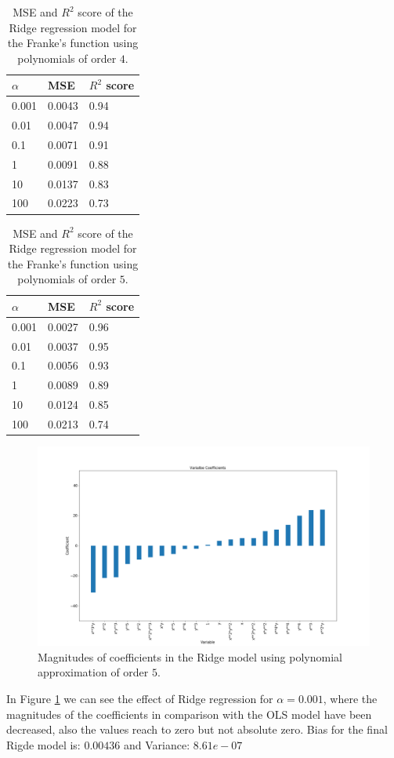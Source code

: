 \documentclass [11pt]{article}
\begin{document}
\begin{table}[H]
\centering
\begin{tabular}{lll}
\hline
$\alpha$ & MSE    & $R^{2}$ score \\ \hline
0.001     & 0.0043 & 0.94          \\
0.01      & 0.0047 & 0.94          \\
0.1       & 0.0071 & 0.91          \\
1         & 0.0091 & 0.88          \\
10        & 0.0137 & 0.83          \\
100       & 0.0223 & 0.73          \\ \hline
\end{tabular}
\caption{MSE and $R^{2}$ score of the Ridge regression model for the Franke's function using polynomials of order $4$.}
\label{tab:ridge4}
\end{table}

\begin{table}[H]
\centering
\begin{tabular}{lll}
\hline
$\alpha$ & MSE    & $R^{2}$ score \\ \hline
0.001     & 0.0027 & 0.96          \\
0.01      & 0.0037 & 0.95          \\
0.1       & 0.0056 & 0.93          \\
1         & 0.0089 & 0.89          \\
10        & 0.0124 & 0.85          \\
100       & 0.0213 & 0.74          \\ \hline
\end{tabular}
\caption{MSE and $R^{2}$ score of the Ridge regression model for the Franke's function using polynomials of order $5$.}
\label{tab:ridge5}
\end{table}

\begin{figure}[H]
\centering
\includegraphics[width=1\textwidth]{figures/coeffRidge.png}
        \caption{Magnitudes of coefficients in the Ridge model using polynomial approximation of order $5$.}
        \label{fig:coeffRidge}
\end{figure}
In Figure \ref{fig:coeffRidge} we can see the effect of Ridge regression for $\alpha=0.001$, where the magnitudes of the coefficients in comparison with the OLS model have been decreased, also the values reach to zero but not absolute zero. Bias for the final Rigde model is: $0.00436$ and Variance: $8.61e-07$
\end{document}
